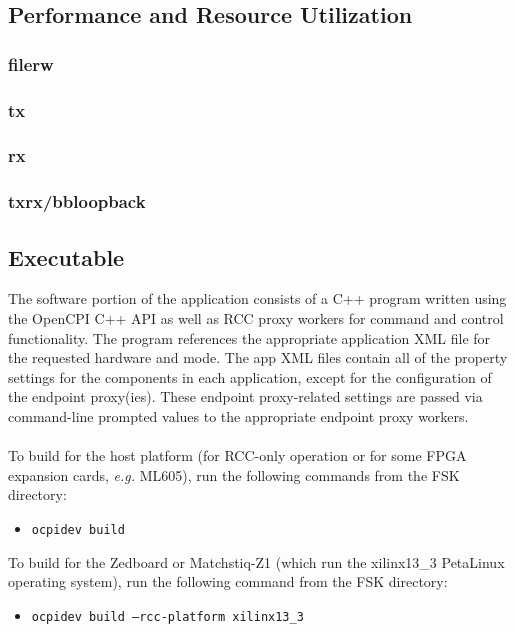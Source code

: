 	\newpage
\begin{landscape}
\subsection{Performance and Resource Utilization}
\subsubsection{filerw}

\subsubsection{tx}

\subsubsection{rx}

\subsubsection{txrx/bbloopback}

\end{landscape}
\subsection{Executable}
The software portion of the application consists of a C++ program written using the OpenCPI C++ API as well as RCC proxy workers for command and control functionality. The program references the appropriate application XML file for the requested hardware and mode. The app XML files contain all of the property settings for the components in each application, except for the configuration of the endpoint proxy(ies). These endpoint proxy-related settings are passed via command-line prompted values to the appropriate endpoint proxy workers.\\
~\\
To build for the host platform (for RCC-only operation or for some FPGA expansion cards, \textit{e.g.} ML605), run the following commands from the FSK directory:
\begin{itemize}
  \item[] \texttt{ocpidev build}
\end{itemize}
To build for the Zedboard or Matchstiq-Z1 (which run the xilinx13\_3 PetaLinux operating system), run the following command from the FSK directory:
\begin{itemize}
  \item[] \texttt{ocpidev build --rcc-platform xilinx13\_3}
\end{itemize}

